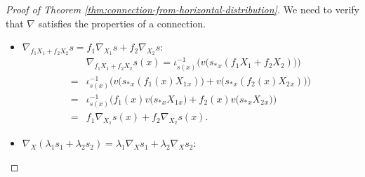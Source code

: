 \begin{proof}[Proof of Theorem \ref{thm:connection-from-horizontal-distribution}]
    We need to verify that $\nabla$ satisfies the properties of a connection. 
    \begin{itemize}
        \item $\nabla_{f_1X_1 + f_2X_2} s = f_1 \nabla_{X_1} s + f_2 \nabla_{X_2} s$:
        \begin{align*}
            &\nabla_{f_1X_1 + f_2X_2} s(x) = \iota_{s(x)}^{-1}\Big(v\big(s_*{}_x(f_1X_1 + f_2X_2)\big)\Big) \\
            =& \iota_{s(x)}^{-1}\Big(v\big(s_*{}_x(f_1(x)X_1{}_x)\big) 
            + v\big(s_*{}_x(f_2(x)X_2{}_x)\big)\Big) \\
            =& \iota_{s(x)}^{-1}\Big(f_1(x) v\big(s_*{}_x X_1{}_x\big) 
            + f_2(x) v\big(s_*{}_x X_2{}_x\big)\Big) \\
            =& f_1 \nabla_{X_1} s(x) + f_2 \nabla_{X_2} s(x).
        \end{align*}
        \item $\nabla_X (\lambda_1 s_1 + \lambda_2 s_2) = \lambda_1 \nabla_X s_1 + \lambda_2 \nabla_X s_2$:
        

\end{itemize}
\end{proof}
